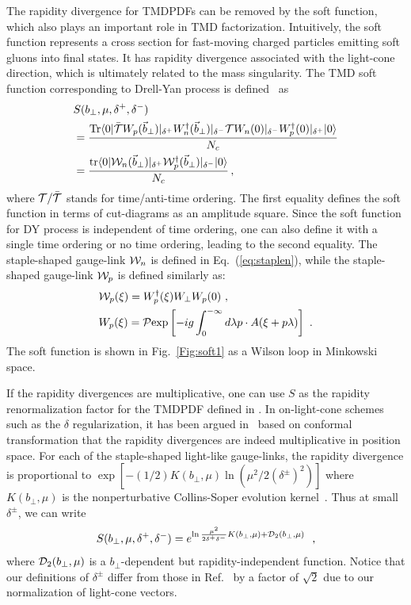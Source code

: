 The rapidity divergence for TMDPDFs can be removed by the
soft function, which also plays an important role in TMD factorization.
Intuitively, the soft function represents a cross section for fast-moving
charged particles emitting soft gluons into final states. It has rapidity divergence associated with the light-cone direction, which
is ultimately related to the mass singularity. The TMD soft function corresponding to Drell-Yan process is defined~\cite{Collins:2011ca,Echevarria:2015byo} as
\begin{align}\label{eq:soft}
	& S(b_\perp,\mu,\delta^+,\delta^-)\nonumber \\
	&=\frac{{\rm Tr}\langle 0|{\cal \bar T}W_p(\vec{b}_\perp)|_{\delta^+}W_n^{\dagger}(\vec{b}_\perp)|_{\delta^-}{\cal T} W_n(0)|_{\delta^-}W^{\dagger}_p(0)|_{\delta^+}|0\rangle }{N_c} \nonumber \\
	&=\frac{{\rm tr}\langle 0|{\cal W}_{n}(\vec{b}_\perp)|_{\delta^+} {\cal W}^{\dagger}_{p}(\vec{b}_\perp)|_{\delta^-}|0\rangle}{N_c} \,,
\end{align}
where ${\cal T}/\bar{\cal T}$ stands for time/anti-time ordering. The first equality defines the soft function in terms of cut-diagrams as an amplitude square. Since the soft function for DY process is independent of time ordering, one can also define it with a single time ordering or no time ordering, leading to the second equality. The staple-shaped gauge-link ${\cal W}_n$ is defined in Eq.~(\ref{eq:staplen}),
while the staple-shaped gauge-link ${\cal W}_p$ is defined similarly as:
\begin{align}
	&{\cal W}_p(\xi)=W^{\dagger}_{p}(\xi)W_{\perp}W_{p}(0) \label{eq:staplep} \ , \\
	&W_{p}(\xi)= {\cal P}{\rm exp}\left[-ig\int_{0}^{-\infty} d\lambda p\cdot A(\xi+p \lambda)\right] \ .
\end{align}
The soft function is shown in Fig.~\ref{Fig:soft1} as a Wilson loop in Minkowski space.

If the rapidity divergences are multiplicative, one can use $S$ as the rapidity renormalization factor for the TMDPDF defined in . In on-light-cone schemes such as the $\delta$ regularization, it has been argued in~\cite{Vladimirov:2017ksc} based on conformal transformation that the rapidity divergences are indeed multiplicative in position space. For each of the staple-shaped light-like gauge-links, the rapidity divergence is proportional to $\exp\left[-(1/2)K(b_\perp,\mu)\ln \left(\mu^2/2(\delta^{\pm})^2\right)\right]$ where $K(b_\perp,\mu)$ is the nonperturbative Collins-Soper evolution kernel~\cite{Collins:1981uk}. Thus at small $\delta^{\pm}$, we can write
\begin{equation}
	S(b_\perp,\mu,\delta^+,\delta^-)=e^{\ln \frac{\mu^2}{2\delta^+\delta^-}K(b_\perp,\mu)+{\cal D}_2(b_\perp,\mu)} \ \ ,
\end{equation}
where ${\cal D}_2(b_\perp,\mu)$ is a $b_\perp$-dependent but rapidity-independent function. Notice that our definitions of $\delta^{\pm}$ differ from those in Ref.~\cite{Echevarria:2015byo} by a factor of $\sqrt{2}$ due to our normalization of light-cone vectors.

